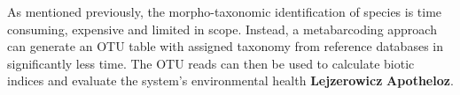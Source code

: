 As mentioned previously, the morpho-taxonomic identification of species is time consuming, expensive and limited in scope. Instead, a metabarcoding approach can generate an OTU table with assigned taxonomy from reference databases in significantly less time. The OTU reads can then be used to calculate biotic indices and evaluate the system's environmental health  \textbf{Lejzerowicz} \textbf{Apotheloz}. 
